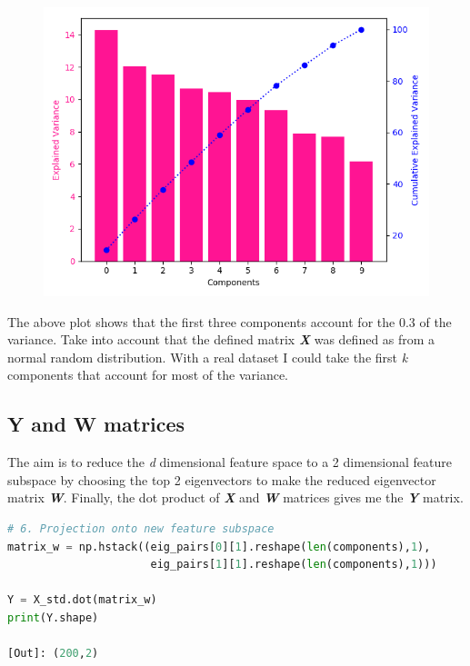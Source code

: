 \begin{figure}[H]
\centering
\includegraphics[width=12cm]{pics/pca_var_exp.png}
\end{figure}

The above plot shows that the first three components account for the 0.3 of the variance. Take into account that the defined matrix \emph{\textbf{X}} was defined as from a normal random distribution. With a real dataset I could take the first \emph{k} components that account for most of the variance.

\subsection{Y and W matrices}
The aim is to reduce the \emph{d} dimensional feature space to a 2 dimensional feature subspace by choosing the top 2 eigenvectors to make the reduced eigenvector matrix \emph{\textbf{W}}. Finally, the dot product of \emph{\textbf{X}} and \emph{\textbf{W}} matrices gives me the \emph{\textbf{Y}} matrix.

\begin{lstlisting}[language=Python]
# 6. Projection onto new feature subspace
matrix_w = np.hstack((eig_pairs[0][1].reshape(len(components),1), 
                      eig_pairs[1][1].reshape(len(components),1)))

Y = X_std.dot(matrix_w)
print(Y.shape)

[Out]: (200,2)
\end{lstlisting}

